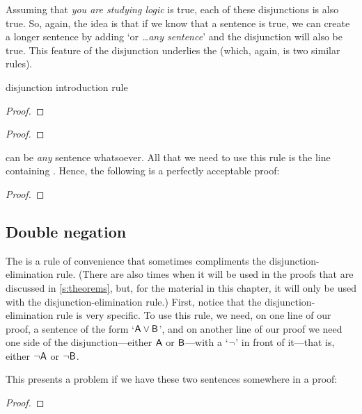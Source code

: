 \noindent Assuming that \textit{you are studying logic} is true, each of these disjunctions is also true. So, again, the idea is that if we know that a sentence is true, we can create a longer sentence by adding `or \ldots \textit{any sentence}' and the disjunction will also be true. This feature of the disjunction underlies the  (which, again, is two similar rules).

\begin{factboxy}{disjunction introduction rule}
\begin{proof}
\end{proof}

\begin{proof}
\end{proof}
\end{factboxy}


\noindent {} can be \emph{any} sentence whatsoever. All that we need to use this rule is the line containing . Hence, the following is a perfectly acceptable proof:
\begin{proof}
	 \pr{}
\end{proof}



\subsection{Double negation}

The  is a rule of convenience that sometimes compliments the disjunction-elimination rule. (There are also times when it will be used in the proofs that are discussed in \ref{s:theorems}, but, for the material in this chapter, it will only be used with the disjunction-elimination rule.) First, notice that the disjunction-elimination rule is very specific. To use this rule, we need, on one line of our proof, a sentence of the form `$\mathsf{A}\vee\mathsf{B}$', and on another line of our proof we need one side of the disjunction---either $\mathsf{A}$ or $\mathsf{B}$---with a `${\neg}$' in front of it---that is, either ${\neg}\mathsf{A}$ or ${\neg}\mathsf{B}$. 

This presents a problem if we have these two sentences somewhere in a proof:
\begin{proof}
\end{proof}

